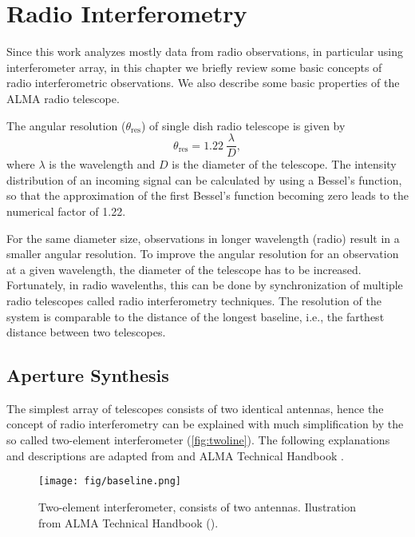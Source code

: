 \chapter{Radio Interferometry}

Since this work analyzes mostly data from radio observations, in particular using interferometer array, in this chapter we briefly review some basic concepts of radio interferometric observations. We also describe some basic properties of the ALMA radio telescope.  

The angular resolution ($\theta_{\text{res}}$) of single dish radio telescope is given by 
\begin{equation}
\theta_{\text{res}} = 1.22\ \frac{\lambda}{D},
\label{eq:thetares}
\end{equation}
where $\lambda$ is the wavelength and $D$ is the diameter of the telescope. The intensity distribution of an incoming signal can be calculated by using a Bessel's function, so that the approximation of the first Bessel's function becoming zero leads to the numerical factor of 1.22. 

For the same diameter size, observations in longer wavelength (radio) result in a smaller angular resolution. To improve the angular resolution for an observation at a given wavelength, the diameter of the telescope has to be increased. Fortunately, in radio wavelenths, this can be done by synchronization of multiple radio telescopes called radio interferometry techniques. The resolution of the system is comparable to the distance of the longest baseline, i.e., the farthest distance between two telescopes.

\section{Aperture Synthesis}

The simplest array of telescopes consists of two identical antennas, hence the concept of radio interferometry can be explained with much simplification by the so called two-element interferometer (\autoref{fig:twoline}). The following explanations and descriptions are adapted from \cite{burke2014} and ALMA Technical Handbook \citep{almatech2016}.

\begin{figure}[!ht]
\centering
\texttt{[image: fig/baseline.png]}
\caption{Two-element interferometer, consists of two antennas. Ilustration from ALMA Technical Handbook (\citeyear{almatech2016}).}
\label{fig:twoline}
\end{figure}

